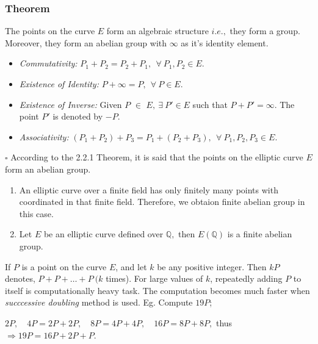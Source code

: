 \documentclass[a4paper, 12pt]{article}
\begin{document}
\subsubsection{Theorem}
The points on the curve $E$ form an algebraic structure $i.e.,$ they form a group. Moreover, they form an abelian group with $\infty$ as it's identity element.\par
\begin{itemize}
	\item \textit{Commutativity:} $P_1+P_2=P_2+P_1,\:\:\forall\: P_1, P_2 \in E$.
	\item \textit{Existence of Identity:} $P+\infty=P,\:\:\forall\: P \in E$.
	\item \textit{Existence of Inverse:} Given $P$ $\in$ $E,\: \exists\: P' \in E$ such that $P+P'=\infty$. The point $P'$ is denoted by $-P$.
	\item \textit{Associativity:} $(P_1+P_2)+P_3=P_1+(P_2+P_3),\:\:\forall \:P_1,P_2,P_3 \in E$.
\end{itemize}
$\square$\newline
According to the 2.2.1 Theorem, it is said that the points on the elliptic curve $E$ form an abelian group. 
\begin{enumerate}
	\item An elliptic curve over a finite field has only finitely many points with coordinated in that finite field. Therefore, we obtaion finite abelian group in this case.
	\item Let $E$ be an elliptic curve defined over $\mathbb{Q},$ then $E(\mathbb{Q})$ is a finite abelian group.\end{enumerate}
If $P$ is a point on the curve $E$, and let $k$ be any positive integer. Then $kP$ denotes, $P+P+\dotso +P\: (k$ times). For large values of $k$, repeatedly adding $P$ to itself is computationally heavy task. The computation becomes much faster when \textit{succcessive doubling} method is used. \newline Eg. Compute $19P$;
\begin{center}
$2P,\quad 4P=2P+2P,\quad 8P=4P+4P,\quad 16P=8P+8P,$ \newline thus $\Rightarrow19P=16P+2P+P$.
\end{center}
\end{document}
